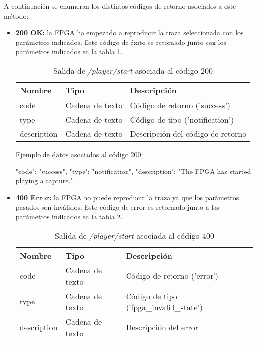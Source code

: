 A continuación se enumeran los distintos códigos de retorno asociados a este método:
\begin{itemize}

\item{\textbf{200 OK:} la \gls{FPGA} ha empezado a reproducir la \gls{traza} seleccionada con los parámetros indicados. Este código de éxito es retornado junto con los parámetros indicados en la tabla \ref{extra:api:playerstart:ok}.
\begin{table}[H]
\centering
\begin{tabular}{|l|l|l|}
\hline
\rowcolor[HTML]{F5F5F5}
\textbf{Nombre}  & \textbf{Tipo}   & \textbf{Descripción}              \\ \hline
code             & Cadena de texto & Código de retorno ('success')     \\ \hline
type             & Cadena de texto & Código de tipo ('notification')   \\ \hline
description      & Cadena de texto & Descripción del código de retorno \\ \hline
\end{tabular}
\caption{Salida de \textit{/player/start} asociada al código 200}
\label{extra:api:playerstart:ok}
\end{table}
\begin{minipage}{\textwidth}
Ejemplo de datos asociados al código 200:

\begin{code}[language=json]
{
  "code": "success",
  "type": "notification",
  "description": "The FPGA has started playing a capture."
}
\end{code}
\end{minipage}
}

\item{\textbf{400 Error:} la \gls{FPGA} no puede reproducir la \gls{traza} ya que los parámetros pasados son inválidos. Este código de error es retornado junto a los parámetros indicados en la tabla \ref{extra:api:playerstart:error400}.
\begin{table}[H]
\centering
\begin{tabular}{|l|l|l|}
\hline
\rowcolor[HTML]{F5F5F5}
\textbf{Nombre}  & \textbf{Tipo}   & \textbf{Descripción}                    \\ \hline
code             & Cadena de texto & Código de retorno ('error')             \\ \hline
type             & Cadena de texto & Código de tipo ('fpga\_invalid\_state') \\ \hline
description      & Cadena de texto & Descripción del error                   \\ \hline
\end{tabular}
\caption{Salida de \textit{/player/start} asociada al código 400}
\label{extra:api:playerstart:error400}
\end{table}

}
\end{itemize}
